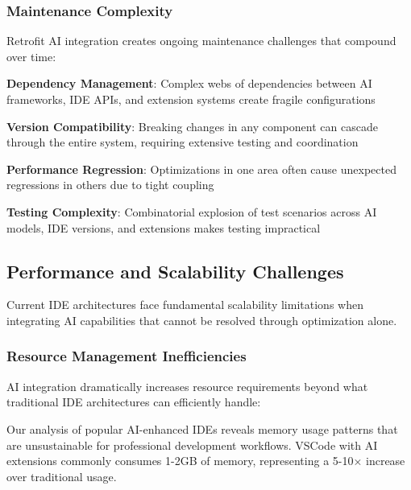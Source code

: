 \subsubsection{Maintenance Complexity}

Retrofit AI integration creates ongoing maintenance challenges that compound over time:

\begin{expandedlist}
    \item \textbf{Dependency Management}: Complex webs of dependencies between AI frameworks, IDE APIs, and extension systems create fragile configurations
    
    \item \textbf{Version Compatibility}: Breaking changes in any component can cascade through the entire system, requiring extensive testing and coordination
    
    \item \textbf{Performance Regression}: Optimizations in one area often cause unexpected regressions in others due to tight coupling
    
    \item \textbf{Testing Complexity}: Combinatorial explosion of test scenarios across AI models, IDE versions, and extensions makes testing impractical
\end{expandedlist}

\subsection{Performance and Scalability Challenges}
\label{subsec:performance-scalability}

Current IDE architectures face fundamental scalability limitations when integrating AI capabilities that cannot be resolved through optimization alone.

\subsubsection{Resource Management Inefficiencies}

AI integration dramatically increases resource requirements beyond what traditional IDE architectures can efficiently handle:

\begin{successbox}
Our analysis of popular AI-enhanced IDEs reveals memory usage patterns that are unsustainable for professional development workflows. VSCode with AI extensions commonly consumes 1-2GB of memory, representing a 5-10× increase over traditional usage.
\end{successbox}

